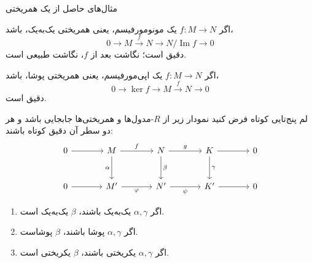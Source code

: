 \begin{frame}[t]{مثال‌های حاصل از یک همریختی}
    \label{lec16:mono-epi-examples}
    \begin{example}
        اگر \(f:M\to N\) یک مونومورفیسم، یعنی همریختی یک‌به‌یک، باشد،
        \[
            0\longrightarrow M\xrightarrow{f}N
            \longrightarrow N/\operatorname{Im}f\longrightarrow0
        \]
        دقیق است؛ نگاشت بعد از \(f\)، نگاشت طبیعی است.
    \end{example}
    \begin{example}
        اگر \(f:M\to N\) یک اپی‌مورفیسم، یعنی همریختی پوشا، باشد،
        \[
            0\longrightarrow\ker f\longrightarrow M\xrightarrow{f}N
            \longrightarrow0
        \]
        دقیق است.
    \end{example}
\end{frame}

\begin{frame}[t]{لم پنج‌تایی کوتاه}
    \label{lec16:short-five-lemma}
    فرض کنید نمودار زیر از \(R\)-مدول‌ها و همریختی‌ها جابجایی باشد و هر دو سطر آن دقیق کوتاه باشند:
    \[
    \begin{tikzcd}[ampersand replacement=\&,column sep=large,row sep=large]
        0\arrow[r]\& M\arrow[r,"f"]\arrow[d,"\alpha"']
        \& N\arrow[r,"g"]\arrow[d,"\beta"]
        \& K\arrow[r]\arrow[d,"\gamma"]\&0\\
        0\arrow[r]\& M'\arrow[r,"\varphi"']
        \& N'\arrow[r,"\psi"']\& K'\arrow[r]\&0
    \end{tikzcd}
    \]
    \begin{enumerate}
        \item اگر \(\alpha,\gamma\) یک‌به‌یک باشند، \(\beta\) یک‌به‌یک است.
        \item اگر \(\alpha,\gamma\) پوشا باشند، \(\beta\) پوشاست.
        \item اگر \(\alpha,\gamma\) یکریختی باشند، \(\beta\) یکریختی است.
    \end{enumerate}
\end{frame}

